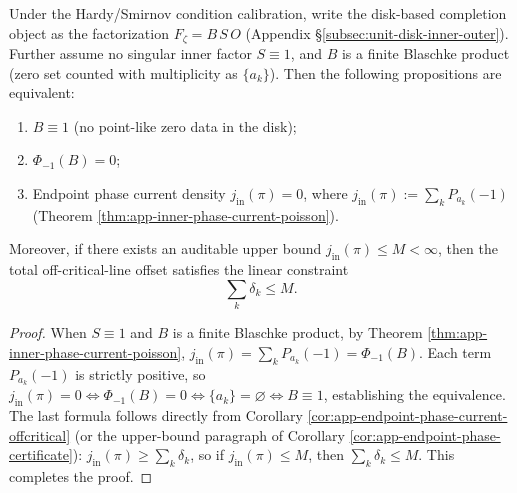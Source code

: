 \begin{corollary}\label{cor:xi-extreme-resonance-criterion}
Under the Hardy/Smirnov condition calibration, write the disk-based completion object as the factorization \(F_{\zeta}=B\,S\,O\) (Appendix \S\ref{subsec:unit-disk-inner-outer}).
Further assume no singular inner factor \(S\equiv 1\), and \(B\) is a finite Blaschke product (zero set counted with multiplicity as \(\{a_k\}\)).
Then the following propositions are equivalent:
\begin{enumerate}
  \item \(B\equiv 1\) (no point-like zero data in the disk);
  \item \(\Phi_{-1}(B)=0\);
  \item Endpoint phase current density \(j_{\mathrm{in}}(\pi)=0\), where \(j_{\mathrm{in}}(\pi):=\sum_k P_{a_k}(-1)\) (Theorem \ref{thm:app-inner-phase-current-poisson}).
\end{enumerate}
Moreover, if there exists an auditable upper bound \(j_{\mathrm{in}}(\pi)\le M<\infty\), then the total off-critical-line offset satisfies the linear constraint
\[
\sum_k\delta_k\le M.
\]
\end{corollary}

\begin{proof}
When \(S\equiv 1\) and \(B\) is a finite Blaschke product, by Theorem \ref{thm:app-inner-phase-current-poisson},
\(
j_{\mathrm{in}}(\pi)=\sum_k P_{a_k}(-1)=\Phi_{-1}(B)
\).
Each term \(P_{a_k}(-1)\) is strictly positive, so
\(
j_{\mathrm{in}}(\pi)=0
\iff
\Phi_{-1}(B)=0
\iff
\{a_k\}=\varnothing
\iff
B\equiv 1
\),
establishing the equivalence.
The last formula follows directly from Corollary \ref{cor:app-endpoint-phase-current-offcritical} (or the upper-bound paragraph of Corollary \ref{cor:app-endpoint-phase-certificate}): \(j_{\mathrm{in}}(\pi)\ge \sum_k\delta_k\), so if \(j_{\mathrm{in}}(\pi)\le M\), then \(\sum_k\delta_k\le M\). This completes the proof.
\end{proof}


